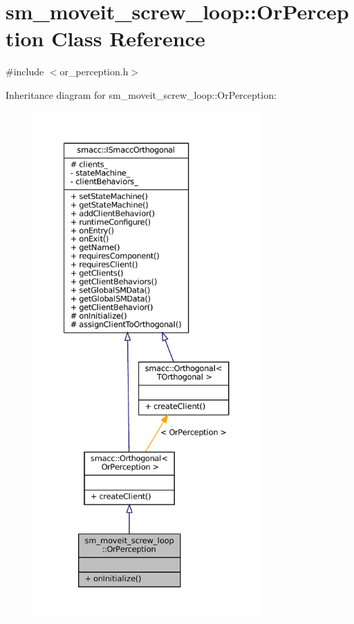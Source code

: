 \hypertarget{classsm__moveit__screw__loop_1_1OrPerception}{}\section{sm\+\_\+moveit\+\_\+screw\+\_\+loop\+:\+:Or\+Perception Class Reference}
\label{classsm__moveit__screw__loop_1_1OrPerception}


{\ttfamily \#include $<$or\+\_\+perception.\+h$>$}



Inheritance diagram for sm\+\_\+moveit\+\_\+screw\+\_\+loop\+:\+:Or\+Perception\+:
\nopagebreak
\begin{figure}[H]
\begin{center}
\leavevmode
\includegraphics[height=550pt]{classsm__moveit__screw__loop_1_1OrPerception__inherit__graph}
\end{center}
\end{figure}


